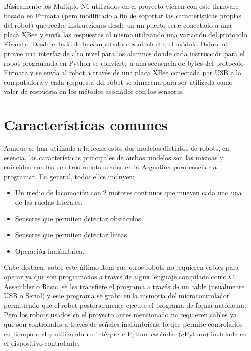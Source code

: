 Básicamente los Multiplo N6 utilizados en el proyecto \proyecto{} vienen
con este firmware basado en Firmata (pero modificado a fin de soportar
las características propias del robot) que recibe instrucciones desde
un un puerto serie conectado a una placa XBee y envía las respuestas
al mismo utilizando una variación del protocolo Firmata. Desde el lado
de la computadora controlante, el módulo Duinobot provee una interfaz
de alto nivel para los alumnos donde cada instrucción para el robot
programada
en Python se convierte a una secuencia de bytes del protocolo Firmata
y se envía al robot a través de una placa XBee conectada por USB a la
computadora y cada respuesta del robot se almacena para ser utilizada
como valor de respuesta en los métodos asociados con los sensores.


\section{Características comunes}
Aunque se han utilizado a la fecha estos dos modelos distintos de robots,
en esencia, las características principales de ambos modelos son las mismas
y coinciden con las de otros robots usados en la Argentina para enseñar a
programar. En general, todos ellos incluyen:
\begin{itemize}
    \item Un medio de locomoción  con 2 motores continuos que mueven cada
        uno una de las ruedas laterales.
    \item Sensores que permiten detectar obstáculos.
    \item Sensores que permiten detectar líneas.
    \item Operación inalámbrica.
\end{itemize}

Cabe destacar sobre este último ítem que otros robots no requieren
cables para operar ya que son programados
a través de algún lenguaje compilado como C, Assembler
o Basic, se les transfiere el programa a través de un
cable (usualmente USB o Serial)
y este programa se graba en la memoria del microcontrolador permitiendo
que el robot posteriormente ejecute el programa de forma autónoma.
Pero los robots usados en el proyecto antes mencionado no requieren
cables ya que son controlados a través de señales
inalámbricas, lo que permite controlarlos en tiempo real y utilizando
un intérprete Python estándar (cPython) instalado en el dispositivo
controlante.


